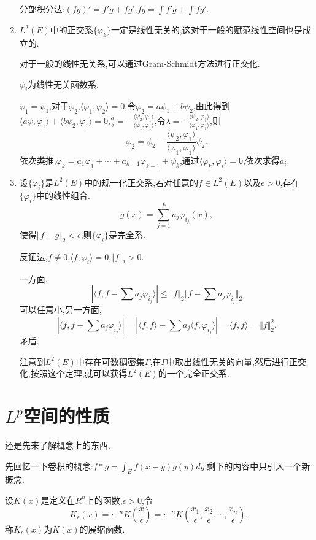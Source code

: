 \documentclass[12pt,a4paper,openany]{book}
\begin{document}
\begin{enumerate}
分部积分法:$(fg)'=f'g+fg'$,$fg = \int{f'g}+\int{fg'}$.

\item $L^2(E)$中的正交系$\{\varphi_k\}$一定是线性无关的,这对于一般的赋范线性空间也是成立的.

对于一般的线性无关系,可以通过Gram-Schmidt方法进行正交化.

$\psi_i$为线性无关函数系.

$\varphi_1=\psi_1$,对于$\varphi_2$,$\langle{\varphi_1,\varphi_2}\rangle=0$,令$\varphi_2=a\psi_1+b\psi_2$,由此得到$\langle{a\psi,\varphi_1}\rangle+\langle{b\psi_2,\varphi_1}\rangle=0$,$\frac{a}{b}=-\frac{\langle{\psi_2,\varphi_1}\rangle}{\langle{\varphi_1,\varphi_1}\rangle}$,令$\lambda=-\frac{\langle{\psi_2,\varphi_1}\rangle}{\langle{\varphi_1,\varphi_1}\rangle}$,则
\[
\varphi_2 = \psi_2 - \frac{\langle{\psi_2,\varphi_1}\rangle}{\langle{\varphi_1,\varphi_1}\rangle}\psi_2.
\]
依次类推,$\varphi_k=a_1\varphi_1+\cdots+a_{k-1}\varphi_{k-1}+\psi_k$,通过$\langle{\varphi_k,\varphi_i}\rangle=0$,依次求得$a_i$.

\item 设$\{\varphi_i\}$是$L^2(E)$中的规一化正交系,若对任意的$f \in L^2(E)$以及$\epsilon>0$,存在$\{\varphi_i\}$中的线性组合.
\[
g(x)=\sum_{j=1}^{k}{a_j\varphi_{i_j}(x)},
\]
使得$\Vert{f-g}\Vert_2 < \epsilon$,则$\{\varphi_i\}$是完全系.

反证法,$f \neq 0$,$\langle{f,\varphi_i}\rangle=0$,$\Vert{f}\Vert_2>0$.

一方面,
\[
|\langle{f,f-\sum{a_j\varphi_{i_j}}}\rangle| \le \Vert{f}\Vert_2\Vert{f-\sum{a_j\varphi_{i_j}}}\Vert_2
\]
可以任意小,另一方面,
\[
|\langle{f,f-\sum{a_j\varphi_{i_j}}}\rangle|=|\langle{f,f}\rangle - \sum{a_j\langle{f,\varphi_{i_j}}\rangle}|=\langle{f,f}\rangle=\Vert{f}\Vert_2^2.
\]
矛盾.

注意到$L^2(E)$中存在可数稠密集$\Gamma$,在$\Gamma$中取出线性无关的向量,然后进行正交化,按照这个定理,就可以获得$L^2(E)$的一个完全正交系.

\end{enumerate}

\section{$L^p$空间的性质}
还是先来了解概念上的东西.

先回忆一下卷积的概念:$f*g=\int_{E}{f(x-y)g(y)dy}$,剩下的内容中只引入一个新概念.

设$K(x)$是定义在$R^n$上的函数,$\epsilon>0$,令
\[
K_{\epsilon}(x)=\epsilon^{-n}K(\frac{x}{\epsilon})=\epsilon^{-n}K(\frac{x_1}{\epsilon},\frac{x_2}{\epsilon},\cdots,\frac{x_n}{\epsilon}),
\]
称$K_{\epsilon}(x)$为$K(x)$的展缩函数.
\end{document}
